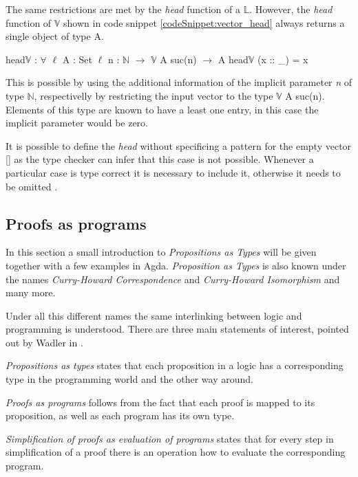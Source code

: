 The same restrictions are met by the \emph{head} function of a $\mathbb{L}$. 
However, the \emph{head} function of $\mathbb{V}$ shown in code snippet \ref{codeSnippet:vector_head} always returns a single object of type A.

\begin{codesnippet}[mathescape=true, caption={Definition of $head\mathbb{V}$ function in Agda}, label={codeSnippet:vector_head}]
head$\mathbb{V}$ : $\forall$ {$\ell$} {A : Set $\ell$} {n : $\mathbb{N}$} $\rightarrow$ 
        $\mathbb{V}$ A suc(n) $\rightarrow$ A
head$\mathbb{V}$ (x :: _) = x
\end{codesnippet}

This is possible by using the additional information of the implicit parameter \emph{n} of type $\mathbb{N}$, respectivelly by restricting the input vector to the type $\mathbb{V}$ A suc(n).
Elements of this type are known to have a least one entry, in this case the implicit parameter would be zero.

It is possible to define the \emph{head} without specificing a pattern for the empty vector [] as the type checker can infer that this case is not possible.
Whenever a particular case is type correct it is necessary to include it, otherwise it needs to be omitted \cite{norell:deptyped}.

\subsection{Proofs as programs}\label{section:agda_proofs}
In this section a small introduction to \emph{Propositions as Types}\cite{10.1145/2699407} will be given together with a few examples in Agda. \emph{Proposition as Types} is also known under the names \emph{Curry-Howard Correspondence}\cite{10.5555/1076265} and \emph{Curry-Howard Isomorphism}\cite{10.1145/2841316} and many more.

Under all this different names the same interlinking between logic and programming is understood. There are three main statements of interest, pointed out by Wadler in \cite{10.1145/2699407}.

\emph{Propositions as types} states that each proposition in a logic has a corresponding type in the programming world and the other way around. 

\emph{Proofs as programs} follows from the fact that each proof is mapped to its proposition, as well as each program has its own type.

\emph{Simplification of proofs as evaluation of programs} states that for every step in simplification of a proof there is an operation how to evaluate the corresponding program.

